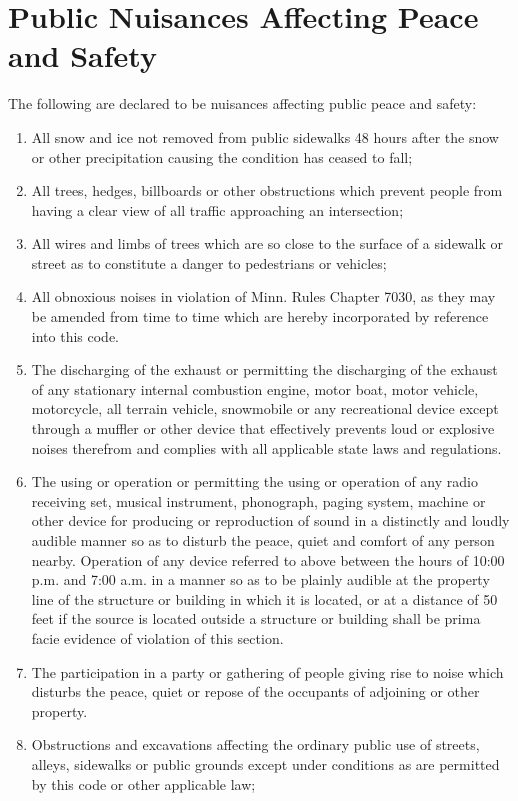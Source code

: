 \section{Public Nuisances Affecting Peace and Safety}
The following are declared to be nuisances affecting public peace and safety:
\begin{enumerate}[{\indent}A)]
    \item All snow and ice not removed from public sidewalks 48 hours after the snow or other precipitation causing the condition has ceased to fall;
    \item All trees, hedges, billboards or other obstructions which prevent people from having a clear view of all traffic approaching an intersection;
    \item All wires and limbs of trees which are so close to the surface of a sidewalk or street as to constitute a danger to pedestrians or vehicles;
    \item All obnoxious noises in violation of Minn. Rules Chapter 7030, as they may be amended from time to time which are hereby incorporated by reference into this code.  
    \item The discharging of the exhaust or permitting the discharging of the exhaust of any stationary internal combustion engine, motor boat, motor vehicle, motorcycle, all terrain vehicle, snowmobile or any recreational device except through a muffler or other device that effectively prevents loud or explosive noises therefrom and complies with all applicable state laws and regulations.
    \item The using or operation or permitting the using or operation of any radio receiving set, musical instrument, phonograph, paging system, machine or other device for producing or reproduction of sound in a distinctly and loudly audible manner so as to disturb the peace, quiet and comfort of any person nearby. Operation of any device referred to above between the hours of 10:00 p.m. and 7:00 a.m. in a manner so as to be plainly audible at the property line of the structure or building in which it is located, or at a distance of 50 feet if the source is located outside a structure or building shall be prima facie evidence of violation of this section.
    \item The participation in a party or gathering of people giving rise to noise which disturbs the peace, quiet or repose of the occupants of adjoining or other property.
    \item Obstructions and excavations affecting the ordinary public use of streets, alleys, sidewalks or public grounds except under conditions as are permitted by this code or other applicable law;

\end{enumerate}
